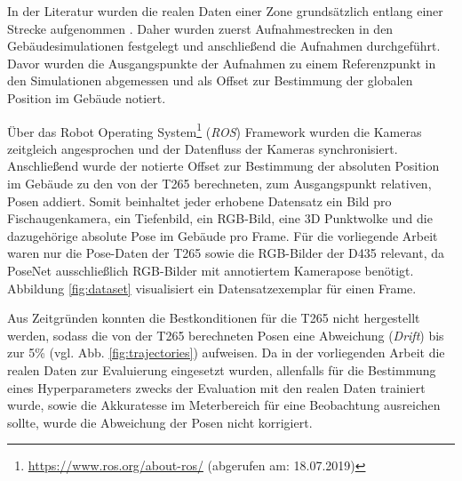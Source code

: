 In der Literatur wurden die realen Daten einer Zone grundsätzlich entlang einer Strecke aufgenommen \cite{kendallPoseNetConvolutionalNetwork2015, clarkVidLocDeepSpatioTemporal2017, acharyaBIMPoseNetIndoorCamera2019}. Daher wurden zuerst Aufnahmestrecken in den Gebäudesimulationen festgelegt und anschließend die Aufnahmen durchgeführt. Davor wurden die Ausgangspunkte der Aufnahmen zu einem Referenzpunkt in den Simulationen abgemessen und als Offset zur Bestimmung der globalen Position im Gebäude notiert.


Über das Robot Operating System\footnote{\url{https://www.ros.org/about-ros/} (abgerufen am: 18.07.2019)} (\textit{ROS}) Framework wurden die Kameras zeitgleich angesprochen und der Datenfluss der Kameras synchronisiert. Anschließend wurde der notierte Offset zur Bestimmung der absoluten Position im Gebäude zu den von der T265 berechneten, zum Ausgangspunkt relativen, Posen addiert. Somit beinhaltet jeder erhobene Datensatz ein Bild pro Fischaugenkamera, ein Tiefenbild, ein RGB-Bild, eine 3D Punktwolke und die dazugehörige absolute Pose im Gebäude pro Frame. Für die vorliegende Arbeit waren nur die Pose-Daten der T265 sowie die RGB-Bilder der D435 relevant, da PoseNet ausschließlich RGB-Bilder mit annotiertem Kamerapose benötigt. Abbildung \ref{fig:dataset} visualisiert ein Datensatzexemplar für einen Frame.

Aus Zeitgründen konnten die Bestkonditionen für die T265 nicht hergestellt werden, sodass die von der T265 berechneten Posen eine Abweichung (\textit{Drift}) bis zur 5\% (vgl. Abb. \ref{fig:trajectories}) aufweisen. Da in der vorliegenden Arbeit die realen Daten zur Evaluierung eingesetzt wurden, allenfalls für die Bestimmung eines Hyperparameters zwecks der Evaluation mit den realen Daten trainiert wurde, sowie die Akkuratesse im Meterbereich für eine Beobachtung ausreichen sollte, wurde die Abweichung der Posen nicht korrigiert.


